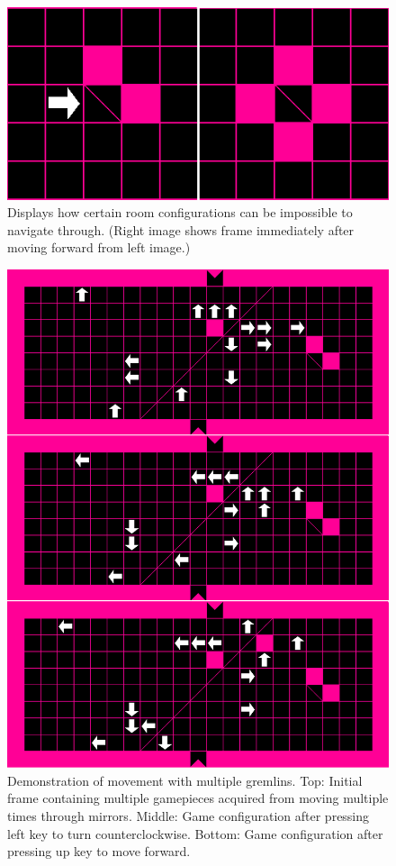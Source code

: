 \documentclass{scrreprt}
\begin{document}
		\begin{figure}[!ht]
			\centering
			\includegraphics[width=\columnwidth]{deathtrap}
			\caption{Displays how certain room configurations can be impossible to navigate through. (Right image shows frame immediately after moving forward from left image.)}
			\label{fig:deathtrap}
		\end{figure}
	
		\begin{figure}[!ht]
			\centering
			\includegraphics[width=\columnwidth]{multi}
			\caption{
				Demonstration of movement with multiple gremlins.
				Top: Initial frame containing multiple gamepieces acquired from moving multiple times through mirrors.
				Middle: Game configuration after pressing left key to turn counterclockwise.
				Bottom: Game configuration after pressing up key to move forward.
			}
			\label{fig:multi}
		\end{figure}
	
\end{document}
